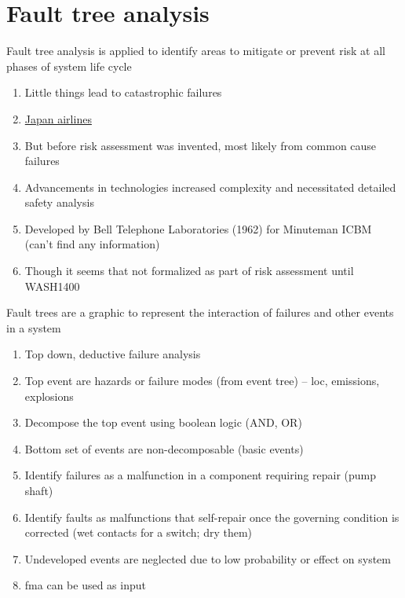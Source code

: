 \documentclass[aspectratio=1610,pdftex,dvipsnames,compress,xcolor={dvipsnames}]{beamer}
\newcommand{\acs}{\acrshort} %
\begin{document}
\section{Fault tree analysis}


\addtocounter{framenumber}{-1}
\begin{frame}{Fault tree analysis is applied to identify areas to mitigate or prevent risk at all phases of system life cycle}
    \begin{enumerate}[series=outerlist,topsep=0pt,itemsep=13pt,leftmargin=*,label=(\arabic*)]
        \item[]Little things lead to catastrophic failures
        \item[]\href{https://www.faa.gov/lessons_learned/transport_airplane/accidents/JA8119}{Japan airlines}
        \item[]But before risk assessment was invented, most likely from common cause failures
        \item[]Advancements in technologies increased complexity and necessitated detailed safety analysis
        \item[]Developed by Bell Telephone Laboratories (1962) for Minuteman ICBM (can't find any information)
        \item[]Though it seems that not formalized as part of risk assessment until WASH1400
    \end{enumerate}
\end{frame}


\begin{frame}{Fault trees are a graphic to represent the interaction of failures and other events in a system}
    \begin{enumerate}[series=outerlist,topsep=0pt,itemsep=11pt,leftmargin=*,label=(\arabic*)]
        \item[]Top down, deductive failure analysis  
        \item[]Top event are hazards or failure modes (from event tree) -- \acs{loc}, emissions, explosions
        \item[]Decompose the top event using boolean logic (AND, OR)
        \item[]Bottom set of events are non-decomposable (basic events)
        \item[]Identify failures as a malfunction in a component requiring repair (pump shaft)
        \item[]Identify faults as malfunctions that self-repair once the governing condition is corrected (wet contacts for a switch; dry them)
        \item[]Undeveloped events are neglected due to low probability or effect on system
        \item[]\acs{fma} can be used as input
    \end{enumerate}
\end{frame}
\end{document}
